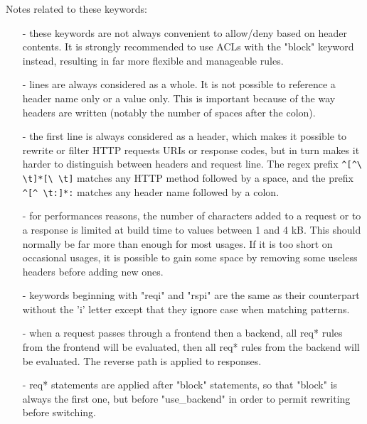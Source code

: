 Notes related to these keywords:
\begin{itemize}
\item[-] these keywords are not always convenient to allow/deny based on header
    contents. It is strongly recommended to use ACLs with the "block" keyword
    instead, resulting in far more flexible and manageable rules.

\item[-] lines are always considered as a whole. It is not possible to reference
    a header name only or a value only. This is important because of the way
    headers are written (notably the number of spaces after the colon).

\item[-] the first line is always considered as a header, which makes it possible to
    rewrite or filter HTTP requests URIs or response codes, but in turn makes
    it harder to distinguish between headers and request line. The regex prefix
    \verb|^[^\ \t]*[\ \t]| matches any HTTP method followed by a space, and the prefix
    \verb|^[^ \t:]*:| matches any header name followed by a colon.

\item[-] for performances reasons, the number of characters added to a request or to
    a response is limited at build time to values between 1 and 4 kB. This
    should normally be far more than enough for most usages. If it is too short
    on occasional usages, it is possible to gain some space by removing some
    useless headers before adding new ones.

\item[-] keywords beginning with "reqi" and "rspi" are the same as their counterpart
    without the 'i' letter except that they ignore case when matching patterns.

\item[-] when a request passes through a frontend then a backend, all req* rules
    from the frontend will be evaluated, then all req* rules from the backend
    will be evaluated. The reverse path is applied to responses.

\item[-] req* statements are applied after "block" statements, so that "block" is
    always the first one, but before "use\_backend" in order to permit rewriting
    before switching.
\end{itemize}
